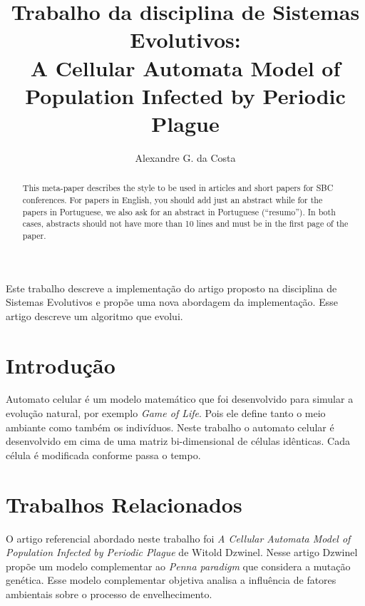 \documentclass[12pt]{article}
\title{Trabalho da disciplina de Sistemas Evolutivos:\\ A Cellular Automata
 Model of Population Infected by Periodic Plague}
\author{Alexandre G. da Costa\inst{1}}
\begin{document}
 

\maketitle

\begin{abstract}
  This meta-paper describes the style to be used in articles and short papers
  for SBC conferences. For papers in English, you should add just an abstract
  while for the papers in Portuguese, we also ask for an abstract in
  Portuguese (``resumo''). In both cases, abstracts should not have more than
  10 lines and must be in the first page of the paper.
\end{abstract}
  
\begin{resumo} 
  Este trabalho descreve a implementação do artigo proposto na disciplina de
  Sistemas Evolutivos e propõe uma nova abordagem da implementação. Esse
  artigo descreve um algoritmo que evolui.
\end{resumo}

\section{Introdução}

Automato celular é um modelo matemático que foi desenvolvido para simular a
evolução natural, por exemplo \textit{Game of Life}. Pois ele define tanto o
meio ambiante como também os indivíduos. Neste trabalho o automato celular é
desenvolvido em cima de uma matriz bi-dimensional de células idênticas. Cada
célula é modificada conforme passa o tempo.


\section{Trabalhos Relacionados}

O artigo referencial abordado neste trabalho foi \textit{A Cellular Automata 
Model of Population Infected by Periodic Plague} de Witold Dzwinel. Nesse
artigo Dzwinel propõe um modelo complementar ao \textit{Penna paradigm}
\cite{almeida1998theoretical, de1998strategies} que considera a mutação
genética. Esse modelo complementar objetiva analisa a influência de fatores
ambientais sobre o processo de envelhecimento.
\end{document}
